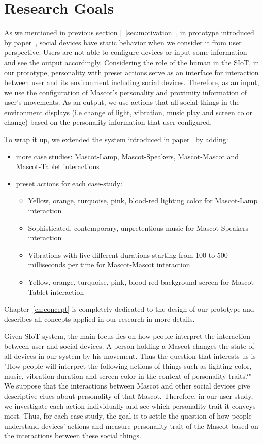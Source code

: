 \section{Research Goals}
\label{sec:research-goals}
As we mentioned in previous section [~\ref{sec:motivation}], in prototype introduced by
paper~\cite{okada2016autonomous}, social devices have static behavior when we consider it from user perspective.
Users are not able to configure devices or input some information and see the output accordingly.
Considering the role of the human in the SIoT, in our prototype, personality with preset actions
serve as an interface for interaction between user and its environment including social devices.
Therefore, as an input, we use the configuration of Mascot's personality and proximity information of user's movements.
As an output, we use actions that all social things in the environment displays (i.e change of light,
vibration, music play and screen color change) based on the personality information that user configured.

To wrap it up, we extended the system introduced in paper~\cite{okada2016autonomous} by adding:
\begin{itemize}
    \item more case studies: Mascot-Lamp, Mascot-Speakers, Mascot-Mascot and Mascot-Tablet interactions
    \item preset actions for each case-study:
    \begin{itemize}
        \item Yellow, orange, turquoise, pink, blood-red lighting color for Mascot-Lamp interaction
        \item Sophisticated, contemporary, unpretentious music for Mascot-Speakers interaction
        \item Vibrations with five different durations starting from 100 to
        500 milliseconds per time for Mascot-Mascot interaction
        \item Yellow, orange, turquoise, pink, blood-red background screen for Mascot-Tablet interaction
    \end{itemize}
\end{itemize}
Chapter~\ref{ch:concept} is completely dedicated to the design of our prototype and
describes all concepts applied in our research in more details.

Given SIoT system, the main focus lies on how people interpret the interaction between user and social devices.
A person holding a Mascot changes the state of all devices in our system by his movement.
Thus the question that interests us is "How people will interpret the following actions of things such as
lighting color, music, vibration duration and screen color in the context of personality traits?"
We suppose that the interactions between Mascot and other social
devices give descriptive clues about personality of that Mascot.
Therefore, in our user study, we investigate each action individually and see which personality trait it conveys most.
Thus, for each case-study, the goal is to settle the question of how people understand devices' actions
and measure personality trait of the Mascot based on the interactions between these social things.


